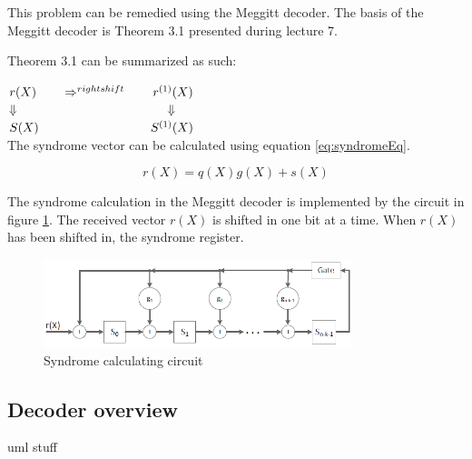 \documentclass[Main]{subfiles}
\begin{document}
This problem can be remedied using the Meggitt decoder. The basis of the Meggitt decoder is Theorem 3.1 presented during lecture 7\cite{lec7}.

\noindent
{}

Theorem 3.1 can be summarized as such:

$ r(X) \hspace*{2em}  \Rightarrow^{rightshift} \hspace*{2em} r^{(1)}(X)$ \\
$ \Downarrow \hspace*{12em} \Downarrow$ \\
$ S(X) \hspace*{9em} S^{(1)}(X)$ \\

The syndrome vector can be calculated using equation \ref{eq:syndromeEq}.

\begin{equation} \label{eq:syndromeEq}
r(X) = q(X)g(X)+s(X)
\end{equation}

The syndrome calculation in the Meggitt decoder is implemented by the circuit in figure \ref{fig:syndromeCirc}. The received vector $r(X)$ is shifted in one bit at a time. When $r(X)$ has been shifted in, the syndrome register.

\begin{figure}[h]
    \centering
    \includegraphics[width=0.8\textwidth]{figures/syndromeCircuit.png}
    \caption{Syndrome calculating circuit}
    \label{fig:syndromeCirc}
\end{figure}



\subsection{Decoder overview}

uml stuff



\end{document}
